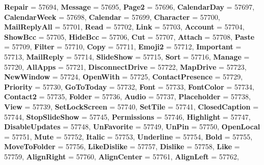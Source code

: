 \begin{DoxyCompactItemize}
{\bfseries Repair} = 57694, 
{\bfseries Message} = 57695, 
{\bfseries Page2} = 57696, 
{\bfseries Calendar\+Day} = 57697, 
\newline
{\bfseries Calendar\+Week} = 57698, 
{\bfseries Calendar} = 57699, 
{\bfseries Character} = 57700, 
{\bfseries Mail\+Reply\+All} = 57701, 
\newline
{\bfseries Read} = 57702, 
{\bfseries Link} = 57703, 
{\bfseries Account} = 57704, 
{\bfseries Show\+Bcc} = 57705, 
\newline
{\bfseries Hide\+Bcc} = 57706, 
{\bfseries Cut} = 57707, 
{\bfseries Attach} = 57708, 
{\bfseries Paste} = 57709, 
\newline
{\bfseries Filter} = 57710, 
{\bfseries Copy} = 57711, 
{\bfseries Emoji2} = 57712, 
{\bfseries Important} = 57713, 
\newline
{\bfseries Mail\+Reply} = 57714, 
{\bfseries Slide\+Show} = 57715, 
{\bfseries Sort} = 57716, 
{\bfseries Manage} = 57720, 
\newline
{\bfseries All\+Apps} = 57721, 
{\bfseries Disconnect\+Drive} = 57722, 
{\bfseries Map\+Drive} = 57723, 
{\bfseries New\+Window} = 57724, 
\newline
{\bfseries Open\+With} = 57725, 
{\bfseries Contact\+Presence} = 57729, 
{\bfseries Priority} = 57730, 
{\bfseries Go\+To\+Today} = 57732, 
\newline
{\bfseries Font} = 57733, 
{\bfseries Font\+Color} = 57734, 
{\bfseries Contact2} = 57735, 
{\bfseries Folder} = 57736, 
\newline
{\bfseries Audio} = 57737, 
{\bfseries Placeholder} = 57738, 
{\bfseries View} = 57739, 
{\bfseries Set\+Lock\+Screen} = 57740, 
\newline
{\bfseries Set\+Tile} = 57741, 
{\bfseries Closed\+Caption} = 57744, 
{\bfseries Stop\+Slide\+Show} = 57745, 
{\bfseries Permissions} = 57746, 
\newline
{\bfseries Highlight} = 57747, 
{\bfseries Disable\+Updates} = 57748, 
{\bfseries Un\+Favorite} = 57749, 
{\bfseries Un\+Pin} = 57750, 
\newline
{\bfseries Open\+Local} = 57751, 
{\bfseries Mute} = 57752, 
{\bfseries Italic} = 57753, 
{\bfseries Underline} = 57754, 
\newline
{\bfseries Bold} = 57755, 
{\bfseries Move\+To\+Folder} = 57756, 
{\bfseries Like\+Dislike} = 57757, 
{\bfseries Dislike} = 57758, 
\newline
{\bfseries Like} = 57759, 
{\bfseries Align\+Right} = 57760, 
{\bfseries Align\+Center} = 57761, 
{\bfseries Align\+Left} = 57762, 

\end{DoxyCompactItemize}
